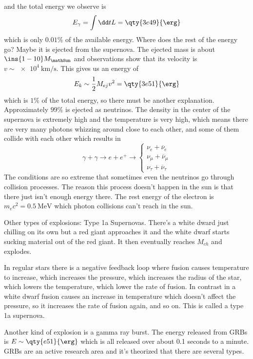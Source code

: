 and the total energy we observe is
\begin{equation}
    E_\gamma = \int \dd t L = \qty{3e49}{\erg}
\end{equation}
which is only \( 0.01\% \) of the available energy. Where does the rest of the energy go? Maybe it is ejected from the supernova. The ejected mass is about \(\ins{1-10}M_\mathSun \) and observations show that its velocity is \(v\sim\qty{e4}{\kilo\meter\per\second}\). This gives us an energy of
\begin{equation}
    E_{k} \sim \frac{1}{2}M_{ej}v^2 = \qty{3e51}{\erg}
\end{equation}
which is \(1\% \) of the total energy, so there must be another explanation. Approximately \(99\% \) is ejected as neutrinos. The density in the center of the supernova is extremely high and the temperature is very high, which means there are very many photons whizzing around close to each other, and some of them collide with each other which results in
\begin{equation}
    \gamma + \gamma \rightarrow e + e^+ \rightarrow \begin{cases}
        \nu_e + \overline{\nu}_e \\
        \nu_\mu + \overline{\nu}_\mu \\
        \nu_\tau + \overline{\nu}_\tau
    \end{cases}
\end{equation}
The conditions are so extreme that sometimes even the neutrinos go through collision processes. The reason this process doesn't happen in the sun is that there just isn't enough energy there. The rest energy of the electron is \(m_{e}c^2 = \qty{0.5}{\mega\electronvolt}\) which photon collisions can't reach in the sun.

Other types of explosions: Type 1a Supernovas. There's a white dward just chilling on its own but a red giant approaches it and the white dwarf starts sucking material out of the red giant. It then eventually reaches \(M_{ch}\) and explodes.

In regular stars there is a negative feedback loop where fusion causes temperature to increase, which increases the pressure, which increases the radius of the star, which lowers the temperature, which lower the rate of fusion. In contrast in a white dwarf fusion causes an increase in temperature which doesn't affect the pressure, so it increases the rate of fusion again, and so on. This is called a type 1a supernova.

Another kind of explosion is a gamma ray burst. The energy released from GRBs is \(E\sim\qty{e51}{\erg}\) which is all released over about 0.1 seconds to a minute. GRBs are an active research area and it's theorized that there are several types.